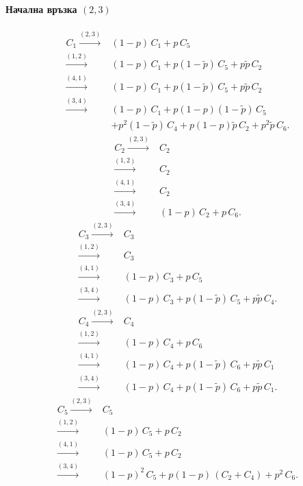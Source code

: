 \documentclass[a4paper,10pt]{article}
\begin{document}
\paragraph{Начална връзка $(2,3)$}
\begin{equation}
\begin{split}
C_1 \xrightarrow{(2,3)}& (1-p)\,C_1 + p\,C_5\\
    \xrightarrow{(1,2)}& (1-p)\,C_1 + p(1-\tilde{p})\,C_5 + p\tilde{p}\,C_2\\
    \xrightarrow{(4,1)}& (1-p)\,C_1 + p(1-\tilde{p})\,C_5 + p\tilde{p}\,C_2\\
    \xrightarrow{(3,4)}& (1-p)\,C_1 + p(1-p)(1-\tilde{p})\,C_5\\
    &+ p^2(1-\tilde{p})\,C_4 + p(1-p)\tilde{p}\,C_2 + p^2\tilde{p}\,C_6.
\end{split}
\end{equation}
%
\begin{equation}
\begin{split}
C_2 \xrightarrow{(2,3)}& C_2\\
    \xrightarrow{(1,2)}& C_2\\
    \xrightarrow{(4,1)}& C_2\\
    \xrightarrow{(3,4)}& (1-p)\,C_2 + p\,C_6.
\end{split}
\end{equation}
%
\begin{equation}
\begin{split}
C_3 \xrightarrow{(2,3)}& C_3\\
    \xrightarrow{(1,2)}& C_3\\
    \xrightarrow{(4,1)}& (1-p)\,C_3 + p\,C_5\\
    \xrightarrow{(3,4)}& (1-p)\,C_3 + p(1-\tilde{p})\,C_5 + p\tilde{p}\,C_4.
\end{split}
\end{equation}
%
\begin{equation}
\begin{split}
C_4 \xrightarrow{(2,3)}& C_4\\
    \xrightarrow{(1,2)}& (1-p)\,C_4 + p\,C_6\\
    \xrightarrow{(4,1)}& (1-p)\,C_4 + p(1-\tilde{p})\,C_6 + p\tilde{p}\,C_1\\
    \xrightarrow{(3,4)}& (1-p)\,C_4 + p(1-\tilde{p})\,C_6 + p\tilde{p}\,C_1.
\end{split}
\end{equation}
%
\begin{equation}
\begin{split}
C_5 \xrightarrow{(2,3)}& C_5\\
    \xrightarrow{(1,2)}& (1-p)\,C_5 + p\,C_2\\
    \xrightarrow{(4,1)}& (1-p)\,C_5 + p\,C_2\\
    \xrightarrow{(3,4)}& (1-p)^2\,C_5 + p(1-p)\,(C_2 + C_4) + p^2\,C_6.
\end{split}
\end{equation}
\end{document}
